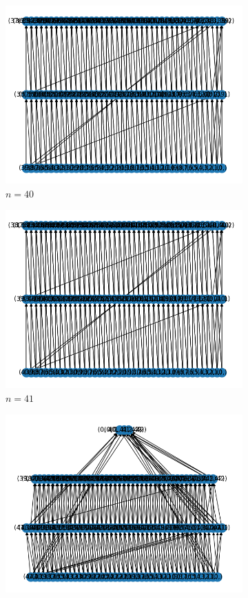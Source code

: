\begin{figure}[h]
    \begin{subfigure}{.5\textwidth}
      \centering
      \includegraphics[width=.8\linewidth]{imagenes/40.png}
      \caption{$n = 40$}
    \end{subfigure}%
    \begin{subfigure}{.5\textwidth}
      \centering
      \includegraphics[width=.8\linewidth]{imagenes/41.png}
      \caption{$ n = 41 $}
    \end{subfigure}
    \begin{subfigure}{.5\textwidth}
        \centering
        \includegraphics[width=.8\linewidth]{imagenes/42.png}

\end{subfigure}
\end{figure}

